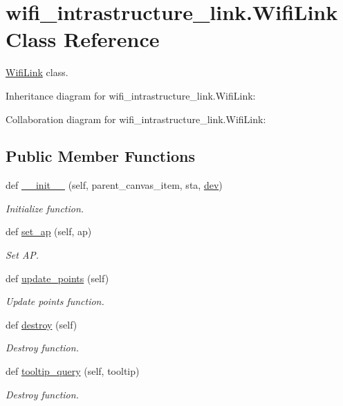 \hypertarget{classwifi__intrastructure__link_1_1WifiLink}{}\section{wifi\+\_\+intrastructure\+\_\+link.\+Wifi\+Link Class Reference}
\label{classwifi__intrastructure__link_1_1WifiLink}


\hyperlink{classwifi__intrastructure__link_1_1WifiLink}{Wifi\+Link} class.  




Inheritance diagram for wifi\+\_\+intrastructure\+\_\+link.\+Wifi\+Link\+:


Collaboration diagram for wifi\+\_\+intrastructure\+\_\+link.\+Wifi\+Link\+:
\subsection*{Public Member Functions}
\begin{DoxyCompactItemize}
\item 
def \hyperlink{classwifi__intrastructure__link_1_1WifiLink_afdfd3aef6448315e67ebe5a619ab1aeb}{\+\_\+\+\_\+init\+\_\+\+\_\+} (self, parent\+\_\+canvas\+\_\+item, sta, \hyperlink{classwifi__intrastructure__link_1_1WifiLink_a08172890e1ead1ce5c3e03eaa166634a}{dev})
\begin{DoxyCompactList}\small\item\em Initialize function. \end{DoxyCompactList}\item 
def \hyperlink{classwifi__intrastructure__link_1_1WifiLink_afaa1042fd08a883313440a580671d05e}{set\+\_\+ap} (self, ap)
\begin{DoxyCompactList}\small\item\em Set AP. \end{DoxyCompactList}\item 
def \hyperlink{classwifi__intrastructure__link_1_1WifiLink_a4d498c880b040b34dec841bf1ff88aa8}{update\+\_\+points} (self)
\begin{DoxyCompactList}\small\item\em Update points function. \end{DoxyCompactList}\item 
def \hyperlink{classwifi__intrastructure__link_1_1WifiLink_a4a0a8b0ae430392d6c76989f21d18290}{destroy} (self)
\begin{DoxyCompactList}\small\item\em Destroy function. \end{DoxyCompactList}\item 
def \hyperlink{classwifi__intrastructure__link_1_1WifiLink_aaaf0fda961dcb052074065345d2124de}{tooltip\+\_\+query} (self, tooltip)
\begin{DoxyCompactList}\small\item\em Destroy function. \end{DoxyCompactList}\end{DoxyCompactItemize}
